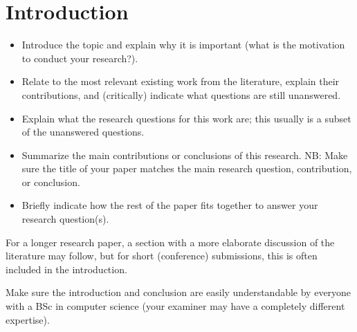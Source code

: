 \section{Introduction}
\begin{itemize}
\item Introduce the topic and explain why it is important (what is the motivation to conduct your research?).

\item Relate to the most relevant existing work from the literature, explain their contributions, and (critically) indicate what questions are still unanswered.

\item Explain what the research questions for this work are; this usually is a subset of the unanswered questions.

\item Summarize the main contributions or conclusions of this research.
NB: Make sure the title of your paper matches the main research question, contribution, or conclusion.

\item Briefly indicate how the rest of the paper fits together to answer your research question(s).
\end{itemize}

For a longer research paper, a section with a more elaborate discussion of the literature may follow, but for short (conference) submissions, this is often included in the introduction.

Make sure the introduction and conclusion are easily understandable by everyone with a BSc in computer science (your examiner may have a completely different expertise).